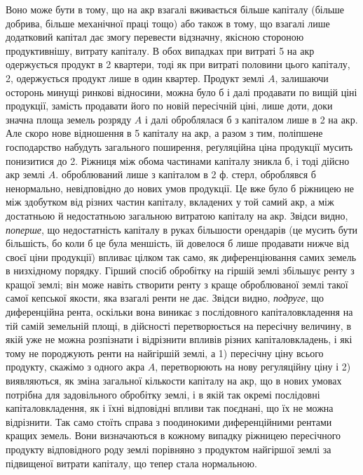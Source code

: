 \parcont{}  %
Воно може бути в тому, що на акр взагалі вживається більше капіталу (більше
добрива, більше механічної праці тощо) або також в тому, що взагалі лише
додатковий капітал дає змогу перевести відзначну, якісною стороною продуктивнішу,
витрату капіталу. В обох випадках при витраті 5 на акр одержується
продукт в 2  квартери, тоді як при витраті половини цього капіталу,
2, одержується продукт лише в один квартер. Продукт землі $A$,
залишаючи осторонь минущі ринкові відносини, можна було б і далі продавати
по вищій ціні продукції, замість продавати його по новій пересічній
ціні, лише доти, доки значна площа земель розряду $A$ і далі оброблялася б
з капіталом лише в 2 на акр. Але скоро нове відношення
в 5 капіталу на акр, а разом з тим, поліпшене господарство набудуть
загального поширення, реґуляційна ціна продукції мусить понизитися до 2. Ріжниця між обома частинами капіталу зникла б, і тоді дійсно акр землі $A$.
оброблюваний лише з капіталом в 2  ф. стерл, оброблявся б ненормально,
невідповідно до нових умов продукції. Це вже було б ріжницею не між здобутком від
різних частин капіталу, вкладених у той самий акр, а між достатньою й недостатньою
загальною витратою капіталу на акр. Звідси видно, \emph{поперше}, що недостатність
капіталу в руках більшости орендарів (це мусить бути більшість, бо коли б це
була меншість, їй довелося б лише продавати нижче від своєї ціни продукції)
впливає цілком так само, як диференціювання самих земель в низхідному порядку.
Гірший спосіб обробітку на гіршій землі збільшує ренту з кращої землі;
він може навіть створити ренту з краще оброблюваної землі такої самої кепської
якости, яка взагалі ренти не дає. Звідси видно, \emph{подруге}, що диференційна рента,
оскільки вона виникає з послідовного капіталовкладення на тій самій земельній
площі, в дійсності перетворюється на пересічну величину, в якій уже не можна
розпізнати і відрізнити впливів різних капіталовкладень, і які тому не породжують
ренти на найгіршій землі, а 1) пересічну ціну всього продукту, скажімо
з одного акра $A$, перетворюють на нову регуляційну ціну і 2) виявляються, як
зміна загальної кількости капіталу на акр, що в нових умовах потрібна для
задовільного обробітку землі, і в якій так окремі послідовні капіталовкладення, як і
їхні відповідні впливи так поєднані, що їх не можна відрізнити. Так само стоїть
справа з поодинокими диференційними рентами кращих земель. Вони визначаються
в кожному випадку ріжницею пересічного продукту відповідного роду землі порівняно
з продуктом найгіршої землі за підвищеної витрати капіталу, що тепер
стала нормальною.

